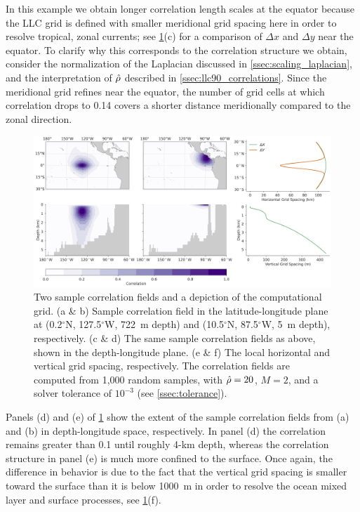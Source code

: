 In this example we obtain longer correlation length scales at the equator
because the LLC grid is defined with smaller meridional grid spacing here in
order to resolve tropical, zonal currents;
see \cref{fig:llc90_correlation_maps}(c) for a comparison of $\Delta x $ and
$\Delta y$ near the equator.
To clarify why this corresponds to the correlation structure we obtain,
consider the normalization of the Laplacian discussed in
\cref{ssec:scaling_laplacian}, and the interpretation of $\hat{\rho}$ described
in \cref{ssec:llc90_correlations}.
Since the meridional grid refines near the equator, the number of grid cells at
which correlation drops to 0.14 covers a shorter distance meridionally compared
to the zonal direction.

\begin{figure}
    \centering
    \includegraphics[width=\textwidth]{../figures/huge_correlation_map_02apps.jpg}
    \caption{Two sample correlation fields and a depiction of the computational
        grid.
        (a \& b) Sample correlation field in the latitude-longitude plane at
        (0.2$^\circ$N, 127.5$^\circ$W, 722~m depth) and
        (10.5$^\circ$N, 87.5$^\circ$W, 5~m depth), respectively.
        (c \& d) The same sample correlation fields as above, shown in the
        depth-longitude plane.
        (e \& f) The local horizontal and vertical grid spacing, respectively.
        The correlation fields are computed from 1,000 random samples,
        with $\hat{\rho} = 20$, $M=2$, and a solver tolerance of $10^{-3}$ (see
        \cref{ssec:tolerance}).
    }
    \label{fig:llc90_correlation_maps}
\end{figure}

Panels (d) and (e) of \cref{fig:llc90_correlation_maps} show the extent of the
sample correlation fields from (a) and (b) in depth-longitude space, respectively.
In panel (d) the correlation remains greater than 0.1 until roughly 4-km
depth, whereas the correlation structure in panel (e) is much more confined to
the surface.
Once again, the difference in behavior is due to the fact that the vertical grid
spacing is smaller toward the surface than it is below 1000~m in order to
resolve the ocean mixed layer and surface processes, see
\cref{fig:llc90_correlation_maps}(f).

